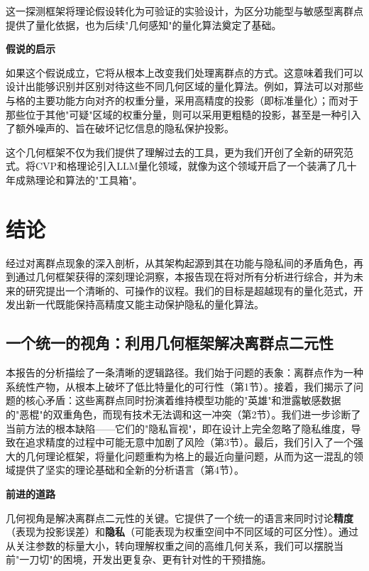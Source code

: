 \documentclass[letterpaper,twocolumn,10pt]{article}
\begin{document}
这一探测框架将理论假设转化为可验证的实验设计，为区分功能型与敏感型离群点提供了量化依据，也为后续"几何感知"的量化算法奠定了基础。

\textbf{假说的启示}

如果这个假说成立，它将从根本上改变我们处理离群点的方式。这意味着我们可以设计出能够识别并区别对待这些不同几何区域的量化算法。例如，算法可以对那些与格的主要功能方向对齐的权重分量，采用高精度的投影（即标准量化）；而对于那些位于其他"可疑"区域的权重分量，则可以采用更粗糙的投影，甚至是一种引入了额外噪声的、旨在破坏记忆信息的隐私保护投影。

这个几何框架不仅为我们提供了理解过去的工具，更为我们开创了全新的研究范式。将CVP和格理论引入LLM量化领域，就像为这个领域开启了一个装满了几十年成熟理论和算法的"工具箱"。

\section{结论}

经过对离群点现象的深入剖析，从其架构起源到其在功能与隐私间的矛盾角色，再到通过几何框架获得的深刻理论洞察，本报告现在将对所有分析进行综合，并为未来的研究提出一个清晰的、可操作的议程。我们的目标是超越现有的量化范式，开发出新一代既能保持高精度又能主动保护隐私的量化算法。

\subsection{一个统一的视角：利用几何框架解决离群点二元性}

本报告的分析描绘了一条清晰的逻辑路径。我们始于问题的表象：离群点作为一种系统性产物，从根本上破坏了低比特量化的可行性（第1节）。接着，我们揭示了问题的核心矛盾：这些离群点同时扮演着维持模型功能的"英雄"和泄露敏感数据的"恶棍"的双重角色，而现有技术无法调和这一冲突（第2节）。我们进一步诊断了当前方法的根本缺陷——它们的"隐私盲视"，即在设计上完全忽略了隐私维度，导致在追求精度的过程中可能无意中加剧了风险（第3节）。最后，我们引入了一个强大的几何理论框架，将量化问题重构为格上的最近向量问题，从而为这一混乱的领域提供了坚实的理论基础和全新的分析语言（第4节）。

\textbf{前进的道路}

几何视角是解决离群点二元性的关键。它提供了一个统一的语言来同时讨论\textbf{精度}（表现为投影误差）和\textbf{隐私}（可能表现为权重空间中不同区域的可区分性）。通过从关注参数的标量大小，转向理解权重之间的高维几何关系，我们可以摆脱当前"一刀切"的困境，开发出更复杂、更有针对性的干预措施。
\end{document}
